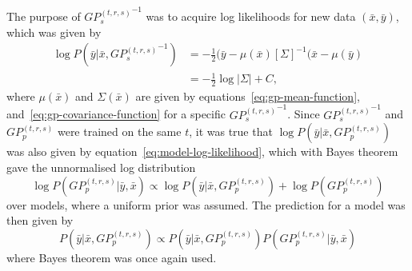 The purpose of ${GP_s^{(t,r,s)}}^{-1}$ was to acquire log likelihoods for new data $(\bar{x}, \bar{y})$, which was given by
\begin{equation}
  \label{eq:model-log-likelihood}
  \begin{split}
    \log P(\bar{y}|\bar{x}, {GP_s^{(t, r,s)}}^{-1}) & = -\frac{1}{2}(\bar{y} - \mu(\bar{x}){[\Sigma]}^{-1}(\bar{x} - \mu(\bar{y}) \\
    & = -\frac{1}{2}\log{|\Sigma|}+C,
  \end{split}
\end{equation}
where $\mu(\bar{x})$ and $\Sigma(\bar{x})$ are given by equations~\ref{eq:gp-mean-function}, and~\ref{eq:gp-covariance-function} for a specific ${GP_s^{(t, r,s)}}^{-1}$. Since ${GP_s^{(t,r,s)}}^{-1}$ and $GP_p^{(t,r,s)}$ were trained on the same $t$, it was true that $\log P(\bar{y}|\bar{x}, GP_p^{(t, r,s)})$ was also given by equation~\ref{eq:model-log-likelihood}, which with Bayes theorem gave the unnormalised log distribution
\begin{equation}
  \label{eq:model-log-model-probability}
  \log P(GP_p^{(t, r,s)} | \bar{y}, \bar{x}) \propto \log P(\bar{y}|\bar{x}, GP_p^{(t, r,s)}) + \log P(GP_p^{(t, r,s)})
\end{equation}
over models, where a uniform prior was assumed. The prediction for a model was then given by
\begin{equation}
  \label{eq:model-prediction-probability}
  P(\bar{y}|\bar{x}, GP_p^{(t, r,s)}) \propto P(\bar{y}|\bar{x}, GP_p^{(t, r,s)})P(GP_p^{(t, r,s)} | \bar{y}, \bar{x})
\end{equation}
where Bayes theorem was once again used.
